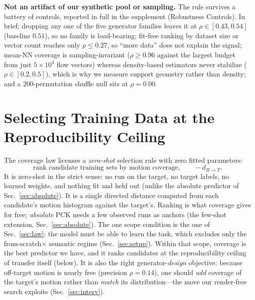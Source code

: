 \documentclass[runningheads]{llncs}
\newcommand{\dbt}{d_{B\to T}}
\newcommand{\pck}{PCK}
\begin{document}
\noindent\textbf{Not an artifact of our synthetic pool or sampling.} The rule
survives a battery of controls, reported in full in the supplement (Robustness
Controls). In brief: dropping any one of the five generator families leaves it
at $\rho\in[0.43,0.54]$ (baseline $0.51$), so no family is load-bearing;
fit-free ranking by dataset size or vector count reaches only $\rho\le0.27$, so
``more data'' does not explain the signal; mean-NN coverage is sampling-invariant
($\rho\ge0.96$ against the largest budget from just $5{\times}10^4$ flow vectors)
whereas density-based estimators never stabilize ($\rho\in[0.2,0.5]$), which is
why we measure support geometry rather than density; and a $200$-permutation
shuffle null sits at $\rho=0.00$.

\section{Selecting Training Data at the Reproducibility Ceiling}
\label{sec:predict}

The coverage law licenses a \emph{zero-shot} selection rule with zero fitted
parameters:
\begin{equation}
\text{rank candidate training sets by motion coverage,}\qquad -\dbt .
\label{eq:rule}
\end{equation}
It is zero-shot in the strict sense: no run on the target, no target labels, no
learned weights, and nothing fit and held out (unlike the absolute predictor of
Sec.~\ref{sec:absolute}). It is a single directed distance computed from each
candidate's motion histogram against the target's.
Ranking is what coverage gives for free; \emph{absolute} \pck{} needs a few
observed runs as anchors (the few-shot extension, Sec.~\ref{sec:absolute}). The one scope condition is the one of Sec.~\ref{sec:law}: the model
must be able to learn the task, which excludes only the from-scratch$\times$
semantic regime (Sec.~\ref{sec:setup}). Within that scope, coverage is
the best predictor we have, and it ranks candidates at the reproducibility
ceiling of transfer itself (below). It is also the right
generator-\emph{design} objective: because off-target motion is nearly free
(precision $\rho{=}0.14$), one should \emph{add} coverage of the target's
motion rather than \emph{match} its distribution---the move our render-free
search exploits (Sec.~\ref{sec:interv}).
\end{document}
